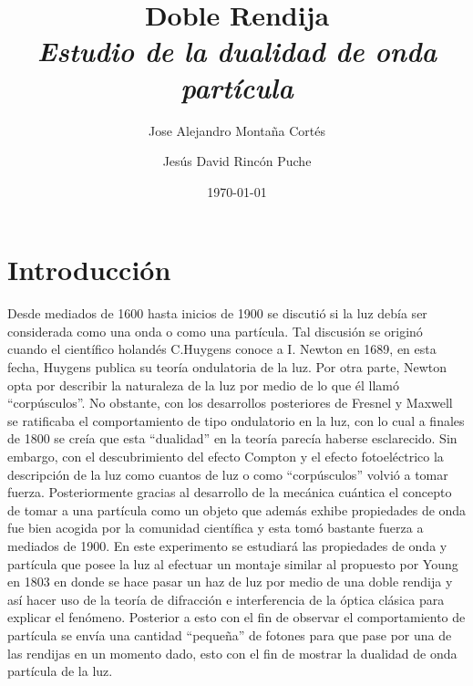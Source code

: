 \documentclass[%
 reprint,
 amsmath,amssymb,
 aps,
]{revtex4-1}
\newcommand{\subtitle}[1]{%
\posttitle{%
    \par\end{center}
\begin{center}\large#1\end{center}
\vskip0.5em}%
}
\begin{document}

\title{Doble Rendija\\ \textit{Estudio de la dualidad de onda partícula} }%


\author{Jose Alejandro Montaña Cortés}
\author{Jesús David Rincón Puche}%
%


\date{\today}%

\begin{abstract}



\end{abstract}

\maketitle


\section{Introducción}
Desde mediados de 1600 hasta inicios de 1900 se discutió si la luz debía ser considerada como una onda o como una partícula. Tal discusión se originó cuando el científico holandés C.Huygens conoce a  I. Newton en 1689, en esta fecha, Huygens publica su  teoría ondulatoria de la luz. Por otra parte, Newton opta por describir la naturaleza de la luz por medio de lo que él llamó “corpúsculos”. No obstante, con los desarrollos posteriores de Fresnel y Maxwell se ratificaba el comportamiento de tipo ondulatorio en la luz, con lo cual a finales de 1800 se creía que esta “dualidad” en la teoría parecía haberse esclarecido. Sin embargo, con el descubrimiento del efecto Compton y el efecto fotoeléctrico la descripción de la luz como cuantos de luz o como “corpúsculos” volvió a tomar fuerza. Posteriormente gracias al desarrollo de la mecánica cuántica el concepto de tomar a una partícula como un objeto que además exhibe propiedades de onda fue bien acogida por la comunidad científica y esta tomó bastante fuerza a mediados de 1900. En este experimento se estudiará las propiedades de onda y partícula que posee la luz al efectuar un montaje similar al propuesto por Young en 1803 en donde se hace pasar un haz de luz por medio de una doble rendija y así hacer uso de la teoría de difracción e interferencia de la óptica clásica para explicar el fenómeno. Posterior a esto con el fin de observar el comportamiento de partícula se envía una cantidad “pequeña” de fotones para que pase por una de las rendijas en un momento dado, esto con el fin de mostrar la dualidad de onda partícula de la luz.
\end{document}
